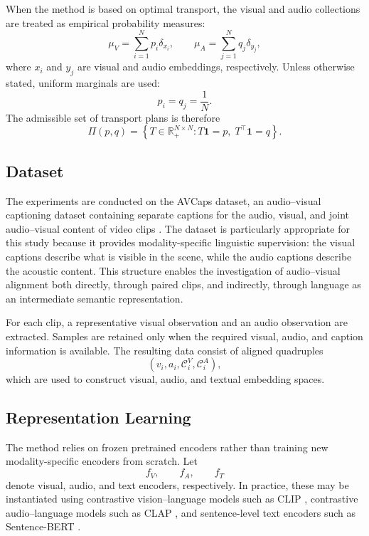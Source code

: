 When the method is based on optimal transport, the visual and audio collections are treated as empirical probability measures:
\begin{equation}
    \mu_V = \sum_{i=1}^{N} p_i \delta_{x_i},
    \qquad
    \mu_A = \sum_{j=1}^{N} q_j \delta_{y_j},
\end{equation}
where $x_i$ and $y_j$ are visual and audio embeddings, respectively. Unless otherwise stated, uniform marginals are used:
\begin{equation}
    p_i = q_j = \frac{1}{N}.
\end{equation}
The admissible set of transport plans is therefore
\begin{equation}
    \Pi(p,q)
    =
    \left\{
    T \in \mathbb{R}_{+}^{N \times N}
    :
    T\mathbf{1}=p,\;
    T^{\top}\mathbf{1}=q
    \right\}.
\end{equation}

\subsection{Dataset}
\label{subsec:dataset}

The experiments are conducted on the AVCaps dataset, an audio--visual captioning dataset containing separate captions for the audio, visual, and joint audio--visual content of video clips \cite{sudarsanam2025avcaps}. The dataset is particularly appropriate for this study because it provides modality-specific linguistic supervision: the visual captions describe what is visible in the scene, while the audio captions describe the acoustic content. This structure enables the investigation of audio--visual alignment both directly, through paired clips, and indirectly, through language as an intermediate semantic representation.

For each clip, a representative visual observation and an audio observation are extracted. Samples are retained only when the required visual, audio, and caption information is available. The resulting data consist of aligned quadruples
\[
    (v_i, a_i, \mathcal{C}^{V}_i, \mathcal{C}^{A}_i),
\]
which are used to construct visual, audio, and textual embedding spaces.

\subsection{Representation Learning}
\label{subsec:representation_learning}

The method relies on frozen pretrained encoders rather than training new modality-specific encoders from scratch. Let
\[
    f_V,\qquad f_A,\qquad f_T
\]
denote visual, audio, and text encoders, respectively. In practice, these may be instantiated using contrastive vision--language models such as CLIP \cite{radford2021learning}, contrastive audio--language models such as CLAP \cite{elizalde2023clap}, and sentence-level text encoders such as Sentence-BERT \cite{reimers2019sentencebert}.

